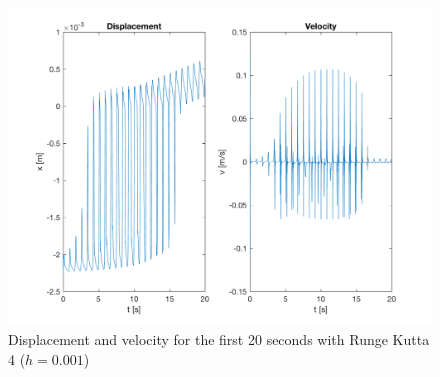 \documentclass[12pt]{report}
\begin{document}
\begin{figure}[h]
	\centering
	\includegraphics[width=15cm]{Pics/DispVeloRK4.png}
	\caption{Displacement and velocity for the first 20 seconds with Runge Kutta 4 ($h = 0.001$)}
	\label{fig:1}
\end{figure}
\end{document}
